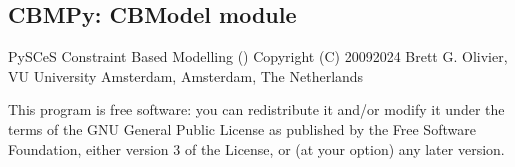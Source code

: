 \documentclass[letterpaper,12pt,english]{sphinxmanual}
\begin{document}
\begin{fulllineitems}
\label{\detokenize{api/core:cbmpy.MinimizeSumOfAbsFluxes}}
\pysigstartsignatures
\pysiglinewithargsret
{}
{\sphinxparamcomma {}}
{}
\pysigstopsignatures
\end{fulllineitems}


\begin{fulllineitems}
\label{\detokenize{api/core:cbmpy.doFBAMinSum}}
\pysigstartsignatures
\pysiglinewithargsret
{}
{\sphinxparamcomma {}}
{}
\pysigstopsignatures
\end{fulllineitems}


\begin{fulllineitems}
\label{\detokenize{api/core:cbmpy.test}}
\pysigstartsignatures
\pysiglinewithargsret
{}
{}
{}
\pysigstopsignatures
\end{fulllineitems}


\subsection{CBMPy: CBModel module}
\label{\detokenize{api/core:cbmpy-cbmodel-module}}\label{\detokenize{api/core:module-cbmpy.CBModel}}
\sphinxAtStartPar
PySCeS Constraint Based Modelling ()
Copyright (C) 2009\sphinxhyphen{}2024 Brett G. Olivier, VU University Amsterdam, Amsterdam, The Netherlands

\sphinxAtStartPar
This program is free software: you can redistribute it and/or modify
it under the terms of the GNU General Public License as published by
the Free Software Foundation, either version 3 of the License, or
(at your option) any later version.
\end{document}
